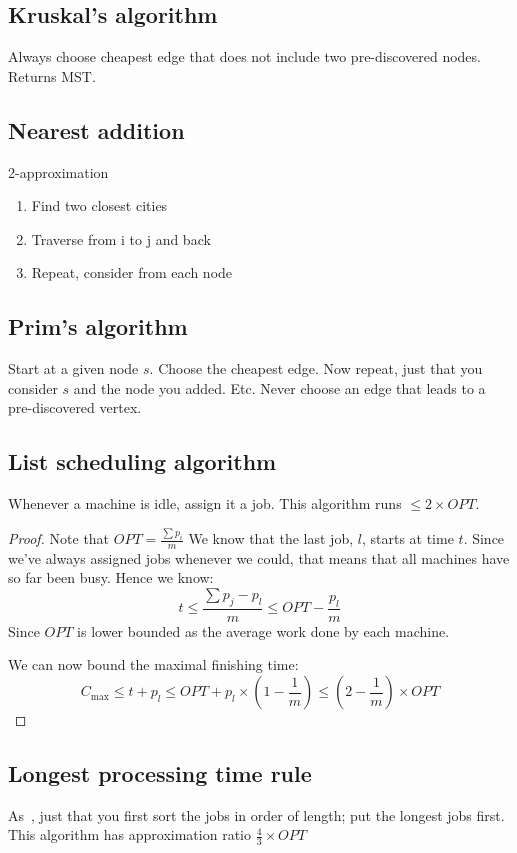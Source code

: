 \subsection{Kruskal's algorithm}
Always choose cheapest edge that does not include two pre-discovered nodes.
Returns MST.\

\subsection{Nearest addition}
2-approximation
\begin{enumerate}
    \item Find two closest cities
    \item Traverse from i to j and back
    \item Repeat, consider from each node
\end{enumerate}

\subsection{Prim's algorithm}
Start at a given node $s$. Choose the cheapest edge. 
Now repeat, just that you consider $s$ and the node you added. Etc.
Never choose an edge that leads to a pre-discovered vertex.

\subsection{List scheduling algorithm}\label{listschedule}
    Whenever a machine is idle, assign it a job.
    This algorithm runs $\leq 2\times OPT$.

    \begin{proof}
        Note that $OPT = \frac{\sum{p_{i}}}{m}$
        We know that the last job, $l$, starts at time $t$. Since we've always
        assigned jobs whenever we could, that means that all machines have 
        so far been busy. Hence we know:
        $$
            t \leq \frac{\sum{p_{j} - p_{l}}}{m} \leq OPT - \frac{p_{l}}{m}
        $$
        Since $OPT$ is lower bounded as the average work done by each machine.

        We can now bound the maximal finishing time: 
        $$
            C_{\max} \leq t + p_{l} \leq OPT + p_{l}\times (1 - \frac{1}{m}) 
            \leq (2 - \frac{1}{m})\times OPT
        $$
    \end{proof}

    \subsection{Longest processing time rule}\label{srpt}
    As~, just that you first sort the jobs in order of 
    length; put the longest jobs first. This algorithm has approximation ratio
    $\frac{4}{3} \times OPT$

